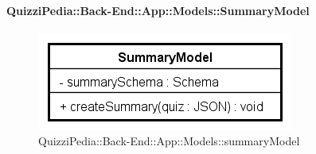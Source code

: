 \paragraph{QuizziPedia::Back-End::App::Models::SummaryModel}
\label{QuizziPedia::Back-End::App::Models::summaryModel}
\begin{figure}[ht]
	\centering
	\includegraphics[scale=0.8]{UML/Classi/Back-End/QuizziPedia_Back-End_App_Models_summaryModel.png}
	\caption{QuizziPedia::Back-End::App::Models::summaryModel}
\end{figure}
\FloatBarrier



